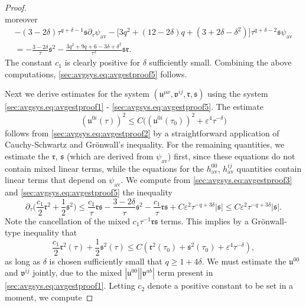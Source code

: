 \documentclass{article}
\newcommand{\av}{\mathrm{av}}
\newcommand{\mf}{\mathfrak}
\newcommand{\ve}{\varepsilon}
\newcommand{\pa}{\partial}
\begin{document}
\begin{proof}
\begin{equation}
    \end{equation}
    moreover
    \begin{multline}
        -(3-2\delta)\tau^{q+\delta-1}\mf{s}\pa_\tau \psi_{\av} - \Big[3q^2+(12-2\delta)q+(3+2\delta-\delta^2)\Big]\tau^{q+\delta-2}\mf{s}\psi_{\av}\\
        = - \frac{3-2\delta}{\tau}\mf{s}^2 - \frac{3q^2+9q+6-3\delta+\delta^2}{\tau^2}\mf{s}\mf{r}.
    \end{multline}
    The constant $c_1$ is clearly positive for $\delta$ sufficiently small. Combining the above computations, \eqref{sec:avgsys.eq:avgestproof5} follows.
    
    Next we derive estimates for the system $(\mf{u}^{\mu\nu}, \mf{v}^{ij}, \mf{r},\mf{s})$ using the system \eqref{sec:avgsys.eq:avgestproof1} - \eqref{sec:avgsys.eq:avgestproof5}. The estimate
    \begin{equation}\label{sec:avgsys.eq:avgestproof7}
     (\mf{u}^{0i}(\tau))^2 \leq C\big((\mf{u}^{0i}(\tau_0))^2 + \ve^4\tau^{-\delta}\big)
    \end{equation}
    follows from \eqref{sec:avgsys.eq:avgestproof2} by a straightforward application of Cauchy-Schwartz and Gr\"onwall's inequality. For the remaining quantities, we estimate the $\mf{r}$, $\mf{s}$ (which are derived from $\psi_{\av}$) first, since these equations do not contain mixed linear terms, while the equations for the $h_{\av}^{00}$, $h_{\av}^{ij}$ quantities contain linear terms that depend on $\psi_{\av}$. We compute from \eqref{sec:avgsys.eq:avgestproof3} and \eqref{sec:avgsys.eq:avgestproof5} the inequality
    \begin{equation}
        \pa_\tau\big(\frac{c_1}{2}\mf{r}^2 + \frac{1}{2}\mf{s}^2\big) \leq \frac{c_1}{\tau}\mf{r}\mf{s} -\frac{3-2\delta}{\tau}\mf{s}^2 - \frac{c_1}{\tau}\mf{r}\mf{s} + C\ve^2 \tau^{-q + 3\delta}|\mf{s}| \leq C\ve^2\tau^{-q+3\delta}|\mf{s}|.
    \end{equation}
    Note the cancellation of the mixed $c_1\tau^{-1}\mf{r}\mf{s}$ terms. This implies by a Gr\"onwall-type inequality that
    \begin{equation}\label{sec:avgsys.eq:avgestproof8}
        \frac{c_1}{2}\mf{r}^2(\tau) + \frac{1}{2}\mf{s}^2(\tau) \leq C(\mf{r}^2(\tau_0) + \mf{s}^2(\tau_0) + \ve^4 \tau^{-\delta}),
    \end{equation}
    as long as $\delta$ is chosen sufficiently small that $q \geq 1+4\delta$. We must estimate the $\mf{u}^{00}$ and $\mf{v}^{ij}$ jointly, due to the mixed $|\mf{u}^{00}||\mf{v}^{ab}|$ term present in \eqref{sec:avgsys.eq:avgestproof1}. Letting $c_2$ denote a positive constant to be set in a moment, we compute

\end{proof}
\end{document}
